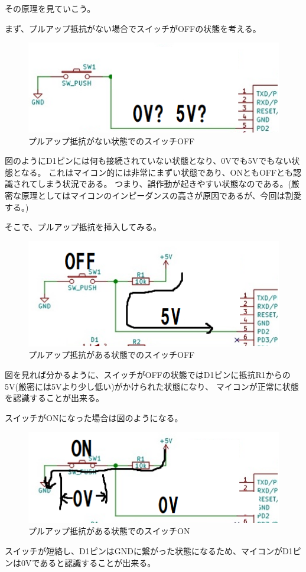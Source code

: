 \documentclass[uplatex]{jsarticle}
\begin{document}
その原理を見ていこう。

まず、プルアップ抵抗がない場合でスイッチがOFFの状態を考える。
\begin{figure}[htbp]
    \centering
    \includegraphics[width=12cm]{switch_5.png}
    \caption{プルアップ抵抗がない状態でのスイッチOFF}
\end{figure}
図のようにD1ピンには何も接続されていない状態となり、0Vでも5Vでもない状態となる。
これはマイコン的には非常にまずい状態であり、ONともOFFとも認識されてしまう状況である。
つまり、誤作動が起きやすい状態なのである。(厳密な原理としてはマイコンのインピーダンスの高さが原因であるが、今回は割愛する。)

そこで、プルアップ抵抗を挿入してみる。
\begin{figure}[htbp]
    \centering
    \includegraphics[width=12cm]{switch_3.png}
    \caption{プルアップ抵抗がある状態でのスイッチOFF}
\end{figure}
図を見れば分かるように、スイッチがOFFの状態ではD1ピンに抵抗R1からの5V(厳密には5Vより少し低い)がかけられた状態になり、
マイコンが正常に状態を認識することが出来る。

スイッチがONになった場合は図のようになる。
\begin{figure}[htbp]
    \centering
    \includegraphics[width=12cm]{switch_4.png}
    \caption{プルアップ抵抗がある状態でのスイッチON}
\end{figure}
スイッチが短絡し、D1ピンはGNDに繋がった状態になるため、マイコンがD1ピンは0Vであると認識することが出来る。
\end{document}
